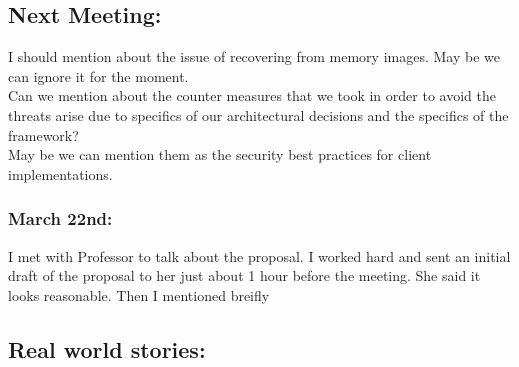 \documentclass[11pt]{article}
\begin{document}
\subsection*{Next Meeting:}
I should mention about the issue of recovering from memory images. May be we can ignore it for the moment.\\
Can we mention about the counter measures that we took in order to avoid the threats arise due to specifics of our architectural decisions and the 
specifics of the framework?\\
May be we can mention them as the security best practices for client implementations.

\subsubsection*{March 22nd:}
I met with Professor to talk about the proposal. I worked hard and sent an initial draft of the proposal to her just about 1 hour before the meeting. 
She said it looks reasonable. Then I mentioned breifly

\subsection*{Real world stories:}
\end{document}
